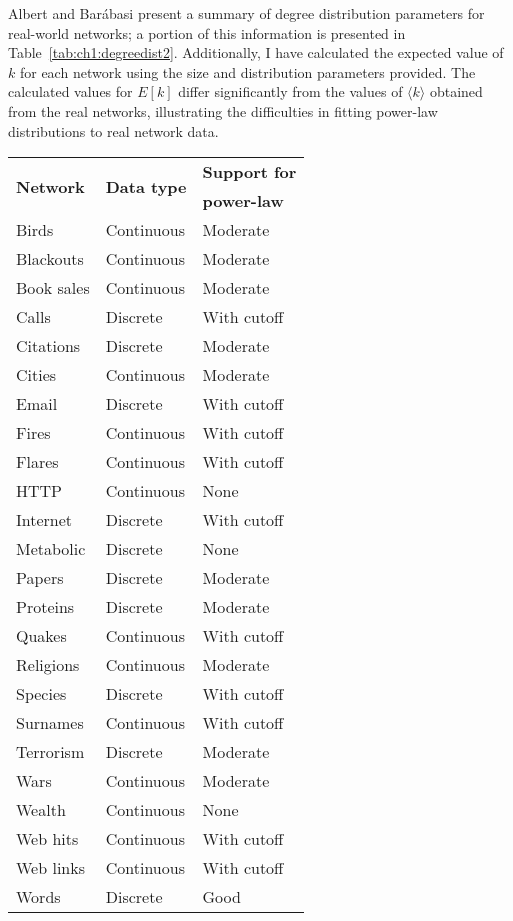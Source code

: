 Albert and Bar\'{a}basi \cite{Albert2002} present a summary of degree distribution parameters for real-world networks; a portion of this information is presented in Table~\ref{tab:ch1:degreedist2}.  Additionally, I have calculated the expected value of $k$ for each network using the size and distribution parameters provided.  The calculated values for $E[k]$ differ significantly from the values of $\langle k \rangle$ obtained from the real networks, illustrating the difficulties in fitting power-law distributions to real network data.


\begin{table}[!htp]
\centering

\begin{tabular}{l l l}
\toprule
%
\multirow{2}{*}{\textbf{Network}} & \multirow{2}{*}{\textbf{Data type}} & \textbf{Support for}\\
                                  &                                     & \textbf{power-law}\\
%
\midrule
%
Birds & Continuous & Moderate\\
Blackouts & Continuous & Moderate\\
Book sales & Continuous & Moderate\\
Calls & Discrete & With cutoff\\
Citations & Discrete & Moderate\\
Cities & Continuous & Moderate\\
Email & Discrete & With cutoff\\
Fires & Continuous & With cutoff\\
Flares & Continuous & With cutoff\\
HTTP & Continuous & None\\
Internet & Discrete & With cutoff\\
Metabolic & Discrete & None\\
Papers & Discrete & Moderate\\
Proteins & Discrete & Moderate\\
Quakes & Continuous & With cutoff\\
Religions & Continuous & Moderate\\
Species & Discrete & With cutoff\\
Surnames & Continuous & With cutoff\\
Terrorism & Discrete & Moderate\\
Wars & Continuous & Moderate\\
Wealth & Continuous & None\\
Web hits & Continuous & With cutoff\\
Web links & Continuous & With cutoff\\
Words & Discrete & Good\\
%
\bottomrule
\end{tabular}


\end{table}
